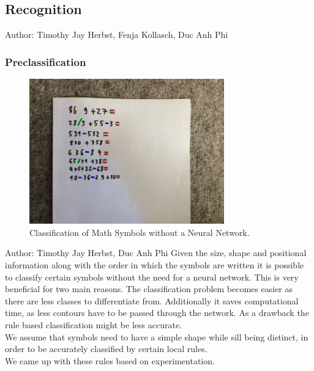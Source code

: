 \documentclass[12pt]{article}
\begin{document}
	\pagebreak\subsection{Recognition}
	\small{Author: Timothy Jay Herbst, Fenja Kollasch, Duc Anh Phi} \newline \newline
	\subsubsection{Preclassification}
	
	\begin{figure}[h!]
		\centering
		\includegraphics[width=0.75\textwidth]{ImagesForReport/preclassify.jpg}
		\caption{Classification of Math Symbols without a Neural Network.}
		\label{fig:preclassify}
	\end{figure}

	\small{Author: Timothy Jay Herbst, Duc Anh Phi} \newline \newline
	Given the size, shape and positional information along with the order in which the symbols are written it is possible to classify certain symbols without the need for a neural network. This is very beneficial for two main reasons. The classification problem becomes easier as there are less classes to differentiate from. Additionally it saves computational time, as less contours have to be passed through the network. As a drawback the rule based classification might be less accurate.\\
	We assume that symbols need to have a simple shape while sill being distinct, in order to be accurately classified by certain local rules.\\
	We came up with these rules based on experimentation.
	
\end{document}
